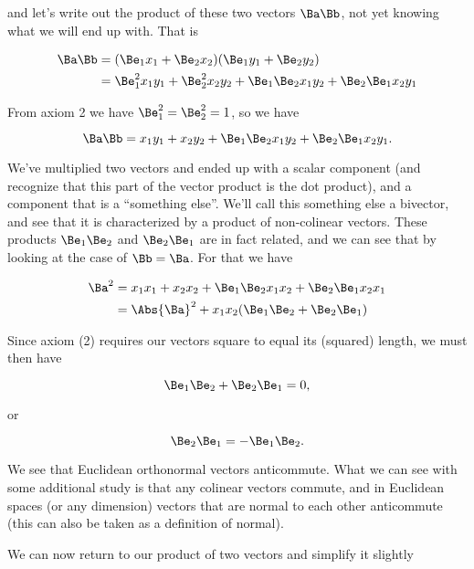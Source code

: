 and let's write out the product of these two vectors $\Ba \Bb$, not yet knowing what we will end up with.  That is

\begin{align*}
\Ba \Bb 
&= (\Be_1 x_1 + \Be_2 x_2 )( \Be_1 y_1 + \Be_2 y_2 ) \\
&= \Be_1^2 x_1 y_1 + \Be_2^2 x_2 y_2
+ \Be_1 \Be_2 x_1 y_2 + \Be_2 \Be_1 x_2 y_1
\end{align*}

From axiom 2 we have $\Be_1^2 = \Be_2^2 = 1$, so we have

\begin{equation}\label{eqn:gaQuickIntro:30}
\Ba \Bb = x_1 y_1 + x_2 y_2 + \Be_1 \Be_2 x_1 y_2 + \Be_2 \Be_1 x_2 y_1.
\end{equation}

We've multiplied two vectors and ended up with a scalar component (and recognize that this part of the vector product is the dot product), and a component that is a ``something else''.  We'll call this something else a bivector, and see that it is characterized by a product of non-colinear vectors.  These products $\Be_1 \Be_2$ and $\Be_2 \Be_1$ are in fact related, and we can see that by looking at the case of $\Bb = \Ba$.  For that we have

\begin{align*}
\Ba^2 
&=
x_1 x_1 + x_2 x_2 + \Be_1 \Be_2 x_1 x_2 + \Be_2 \Be_1 x_2 x_1 \\
&=
\Abs{\Ba}^2 +
x_1 x_2 ( \Be_1 \Be_2 + \Be_2 \Be_1 )
\end{align*}

Since axiom (2) requires our vectors square to equal its (squared) length, we must then have

\begin{equation}\label{eqn:gaQuickIntro:50}
\Be_1 \Be_2 + \Be_2 \Be_1 = 0,
\end{equation}

or

\begin{equation}\label{eqn:gaQuickIntro:70}
\Be_2 \Be_1 = -\Be_1 \Be_2.
\end{equation}

We see that Euclidean orthonormal vectors anticommute.  What we can see with some additional study is that any colinear vectors commute, and in Euclidean spaces (or any dimension) vectors that are normal to each other anticommute (this can also be taken as a definition of normal).

We can now return to our product of two vectors and simplify it slightly

